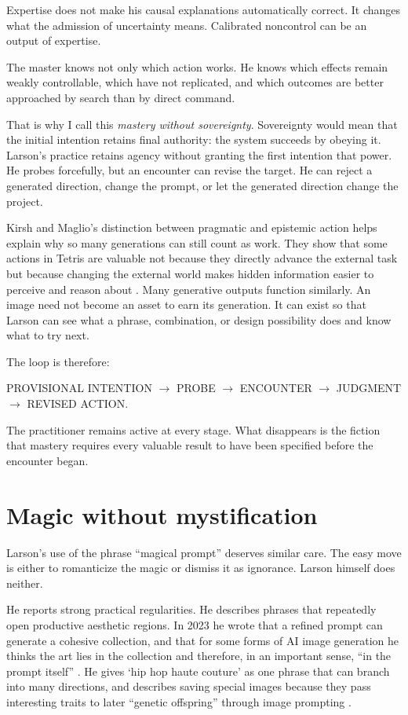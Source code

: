 \documentclass[11pt]{article}
\begin{document}
Expertise does not make his causal explanations automatically correct. It changes what the admission of uncertainty means. Calibrated noncontrol can be an output of expertise.

The master knows not only which action works. He knows which effects remain weakly controllable, which have not replicated, and which outcomes are better approached by search than by direct command.

That is why I call this \emph{mastery without sovereignty}. Sovereignty would mean that the initial intention retains final authority: the system succeeds by obeying it. Larson's practice retains agency without granting the first intention that power. He probes forcefully, but an encounter can revise the target. He can reject a generated direction, change the prompt, or let the generated direction change the project.

Kirsh and Maglio's distinction between pragmatic and epistemic action helps explain why so many generations can still count as work. They show that some actions in Tetris are valuable not because they directly advance the external task but because changing the external world makes hidden information easier to perceive and reason about \cite{KirshMaglio1994}. Many generative outputs function similarly. An image need not become an asset to earn its generation. It can exist so that Larson can see what a phrase, combination, or design possibility does and know what to try next.

The loop is therefore:

\begin{center}
PROVISIONAL INTENTION $\rightarrow$ PROBE $\rightarrow$ ENCOUNTER $\rightarrow$ JUDGMENT $\rightarrow$ REVISED ACTION.
\end{center}

The practitioner remains active at every stage. What disappears is the fiction that mastery requires every valuable result to have been specified before the encounter began.

\section{Magic without mystification}
Larson's use of the phrase ``magical prompt'' deserves similar care. The easy move is either to romanticize the magic or dismiss it as ignorance. Larson himself does neither.

He reports strong practical regularities. He describes phrases that repeatedly open productive aesthetic regions. In 2023 he wrote that a refined prompt can generate a cohesive collection, and that for some forms of AI image generation he thinks the art lies in the collection and therefore, in an important sense, ``in the prompt itself'' \cite{AIArtWeeklyLarson2023}. He gives `hip hop haute couture' as one phrase that can branch into many directions, and describes saving special images because they pass interesting traits to later ``genetic offspring'' through image prompting \cite{AIArtWeeklyLarson2023}.
\end{document}
